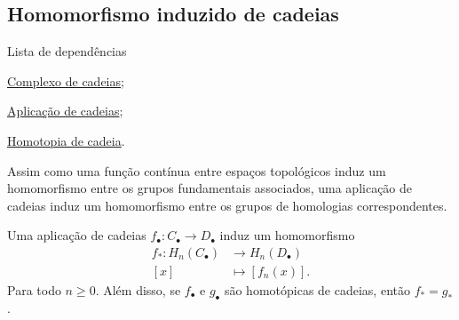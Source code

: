 \subsection{Homomorfismo induzido de cadeias} %
\label{homomorfismo-induzido-de-cadeias-prop}
\begin{titlemize}{Lista de dependências}
	\item \hyperref[complexo-de-cadeias-def]{Complexo de cadeias};\\ 
    \item \hyperref[aplicacao-de-cadeias-def]{Aplicação de cadeias};\\
    \item \hyperref[homotopia-de-cadeias-def]{Homotopia de cadeia}.
\end{titlemize}
Assim como uma função contínua entre espaços topológicos induz um homomorfismo entre os grupos fundamentais associados, uma aplicação de cadeias induz um homomorfismo entre os grupos de homologias correspondentes.
\begin{lemma}%
	Uma aplicação de cadeias $f_\bullet: C_\bullet\rightarrow D_\bullet$ induz um homomorfismo 
    \begin{align*}
        f_*:H_n(C_\bullet)&\longrightarrow H_n(D_\bullet)\\
        [x]&\longmapsto [f_n(x)].
    \end{align*}
    Para todo $n\ge 0$. Além disso, se $f_\bullet$ e $g_\bullet$ são homotópicas de cadeias, então $f_*=g_*$.
\end{lemma}

